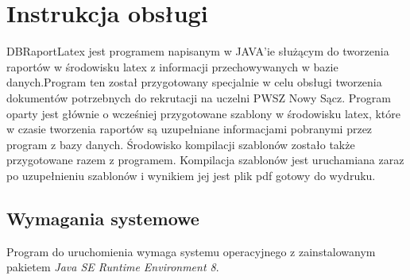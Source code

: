 \chapter{Instrukcja obsługi}
DBRaportLatex jest programem napisanym w JAVA'ie służącym do tworzenia raportów w środowisku latex z informacji przechowywanych w bazie danych.Program ten został przygotowany specjalnie w celu obsługi tworzenia dokumentów potrzebnych do rekrutacji na uczelni PWSZ Nowy Sącz.
Program oparty jest głównie o wcześniej przygotowane szablony w środowisku latex, które w czasie tworzenia raportów są uzupełniane informacjami pobranymi przez program z bazy danych.
Środowisko kompilacji szablonów zostało także przygotowane razem z programem. Kompilacja szablonów jest uruchamiana zaraz po uzupełnieniu szablonów i wynikiem jej jest plik pdf gotowy do wydruku.
\section{Wymagania systemowe}
Program do uruchomienia wymaga systemu operacyjnego z zainstalowanym pakietem \emph{Java SE Runtime Environment 8}.
